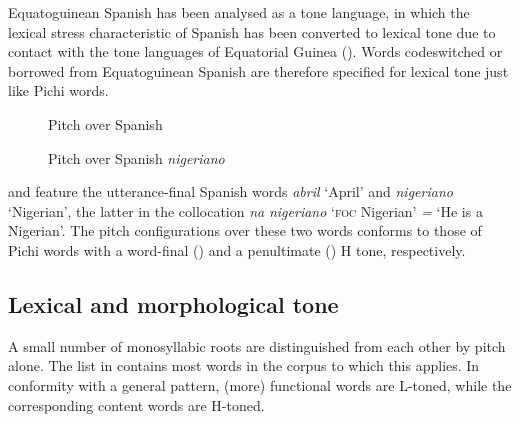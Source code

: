  
Equatoguinean Spanish has been analysed as a tone language, in which the lexical stress characteristic of Spanish has been converted to lexical tone due to contact with the tone languages of Equatorial Guinea (\citealt{Lipski2015,SteienYakpo2017}). Words codeswitched or borrowed from Equatoguinean Spanish are therefore specified for lexical tone just like Pichi words. 

\begin{figure}[h]
\caption{Pitch over Spanish }
\label{fig:key:3.9}
\end{figure}

\begin{figure}
\caption{Pitch over Spanish \textit{nigeriano}}
\label{fig:key:3.10} 
\end{figure}

 
 and  feature the utterance-final Spanish words \textit{abril} ‘April’ and \textit{nigeriano} ‘Nigerian’, the latter in the collocation \textit{na} \textit{nigeriano} ‘\textsc{foc} Nigerian’ \textit{=} ‘He is a Nigerian’. The pitch configurations over these two words conforms to those of Pichi words with a word-final () and a penultimate () H tone, respectively. 


   \newpage 
 
\subsection{Lexical and morphological tone}

A small number of monosyllabic roots are distinguished from each other by pitch alone. The list in  contains most words in the corpus to which this applies. In conformity with a general pattern, (more) functional words are L-toned, while the corresponding content words are H-toned.

